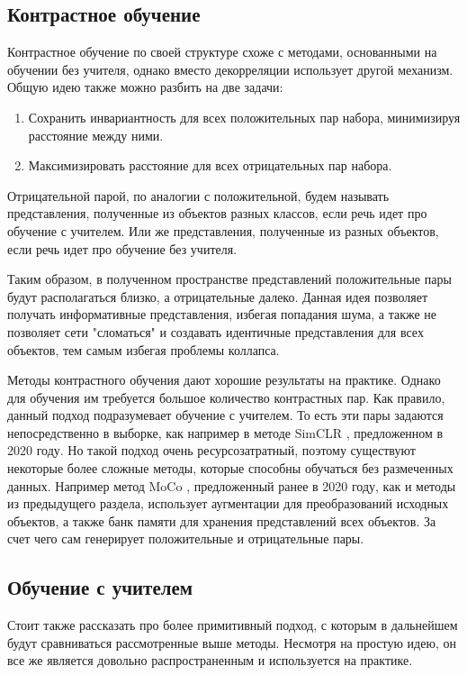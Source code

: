 \subsection{Контрастное обучение}

Контрастное обучение по своей структуре схоже с методами, основанными на обучении без учителя, однако вместо декорреляции использует другой механизм. Общую идею также можно разбить на две задачи:
\begin{enumerate} 
    \item Сохранить инвариантность для всех положительных пар набора, минимизируя расстояние между ними.
    \item Максимизировать расстояние для всех отрицательных пар набора.
\end{enumerate}

Отрицательной парой, по аналогии с положительной, будем называть представления, полученные из объектов разных классов, если речь идет про обучение с учителем. Или же представления, полученные из разных объектов, если речь идет про обучение без учителя. 

Таким образом, в полученном пространстве представлений положительные пары будут располагаться близко, а отрицательные далеко. Данная идея позволяет получать информативные представления, избегая попадания шума, а также не позволяет сети "сломаться" и создавать идентичные представления для всех объектов, тем самым избегая проблемы коллапса.

Методы контрастного обучения дают хорошие результаты на практике. Однако для обучения им требуется большое количество контрастных пар. Как правило, данный подход подразумевает обучение с учителем. То есть эти пары задаются непосредственно в выборке, как например в методе SimCLR \cite{SimCLR}, предложенном в 2020 году. Но такой подход очень ресурсозатратный, поэтому существуют некоторые более сложные методы, которые способны обучаться без размеченных данных. Например метод MoCo \cite{MoCo}, предложенный ранее в 2020 году, как и методы из предыдущего раздела, использует аугментации для преобразований исходных объектов, а также банк памяти для хранения представлений всех объектов. За счет чего сам генерирует положительные и отрицательные пары. 

\subsection{Обучение с учителем}

Стоит также рассказать про более примитивный подход, с которым в дальнейшем будут сравниваться рассмотренные выше методы. Несмотря на простую идею, он все же является довольно распространенным и используется на практике. 

